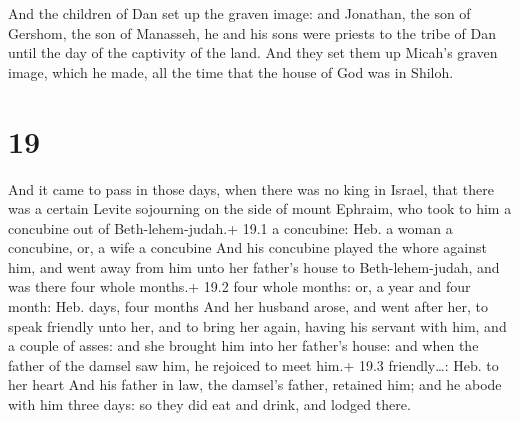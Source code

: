 And the children of Dan set up the graven image: and
Jonathan, the son of Gershom, the son of Manasseh, he and his sons were
priests to the tribe of Dan until the day of the captivity of the land.
 And they set them up Micah's graven image, which he made,
all the time that the house of God was in Shiloh.

\hypertarget{section-18}{%
\section{19}\label{section-18}}

 And it came to pass in those days, when there was no king
in Israel, that there was a certain Levite sojourning on the side of
mount Ephraim, who took to him a concubine out of Beth-lehem-judah.+
19.1 a concubine: Heb. a woman a concubine, or, a wife a concubine
 And his concubine played the whore against him, and went
away from him unto her father's house to Beth-lehem-judah, and was there
four whole months.+ 19.2 four whole months: or, a year and four month:
Heb. days, four months  And her husband arose, and went
after her, to speak friendly unto her, and to bring her again, having
his servant with him, and a couple of asses: and she brought him into
her father's house: and when the father of the damsel saw him, he
rejoiced to meet him.+ 19.3 friendly\ldots: Heb. to her heart
 And his father in law, the damsel's father, retained him;
and he abode with him three days: so they did eat and drink, and lodged
there.

